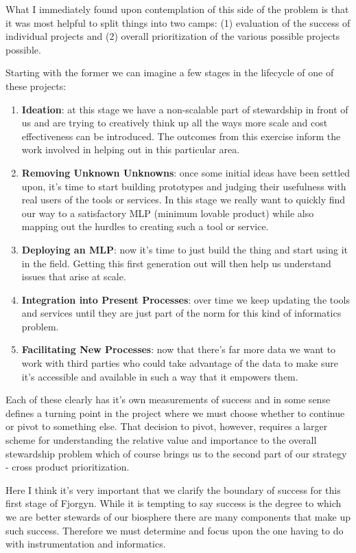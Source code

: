 \documentclass[10pt,a5paper]{book}
\begin{document}
What I immediately found upon contemplation of this side of the problem is that it was most helpful to split things into two camps: (1) evaluation of the success of individual projects and (2) overall prioritization of the various possible projects possible. 

Starting with the former we can imagine a few stages in the lifecycle of one of these projects:

\begin{enumerate}
\item \textbf{Ideation}: at this stage we have a non-scalable part of stewardship in front of us and are trying to creatively think up all the ways more scale and cost effectiveness can be introduced. The outcomes from this exercise inform the work involved in helping out in this particular area.
\item \textbf{Removing Unknown Unknowns}: once some initial ideas have been settled upon, it's time to start building prototypes and judging their usefulness with real users of the tools or services. In this stage we really want to quickly find our way to a satisfactory MLP (minimum lovable product) while also mapping out the hurdles to creating such a tool or service.
\item \textbf{Deploying an MLP}: now it's time to just build the thing and start using it in the field. Getting this first generation out will then help us understand issues that arise at scale.
\item \textbf{Integration into Present Processes}: over time we keep updating the tools and services until they are just part of the norm for this kind of informatics problem. 
\item \textbf{Facilitating New Processes}: now that there's far more data we want to work with third parties who could take advantage of the data to make sure it's accessible and available in such a way that it empowers them. 
\end{enumerate}

Each of these clearly has it's own measurements of success and in some sense defines a turning point in the project where we must choose whether to continue or pivot to something else. That decision to pivot, however, requires a larger scheme for understanding the relative value and importance to the overall stewardship problem which of course brings us to the second part of our strategy - cross product prioritization. 

Here I think it's very important that we clarify the boundary of success for this first stage of Fjorgyn. While it is tempting to say success is the degree to which we are better stewards of our biosphere there are many components that make up such success. Therefore we must determine and focus upon the one having to do with instrumentation and informatics. 
\end{document}

